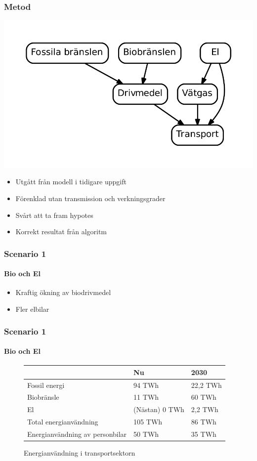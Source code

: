 \documentclass{beamer}
\begin{document}
\begin{frame}
	\frametitle{Metod}
	\includegraphics[scale=0.5]{../report2/diagram.pdf}
	\begin{itemize}
		\item Utgått från modell i tidigare uppgift
		\item Förenklad utan transmission och verkningsgrader
		\item Svårt att ta fram hypotes
		\item Korrekt resultat från algoritm
	\end{itemize}
\end{frame}

\begin{frame}
	\frametitle{Scenario 1}
	\framesubtitle{Bio och El}
	\begin{itemize}
		\item Kraftig ökning av biodrivmedel
		\item Fler elbilar
	\end{itemize}
\end{frame}

\begin{frame}
	\frametitle{Scenario 1}
	\framesubtitle{Bio och El}
	\begin{figure}[h!]
	\begin{center}
	\begin{tabular}{ | l | l | l | }
	\hline
						& Nu		& 2030 \\ \hline
	Fossil energi				& 94 TWh	& 22,2 TWh \\ \hline
	Biobränsle				& 11 TWh	& 60 TWh \\ \hline %
	El					& (Nästan) 0 TWh &  2,2 TWh \\ \hline %
	Total energianvändning		& 105 TWh	& 86 TWh \\ \hline
	Energianvändning av personbilar	& 50 TWh	& 35 TWh \\ \hline
	\end{tabular}
	\caption{Energianvändning i transportsektorn}
	\label{tab:scen1energi}
	\end{center}
	\end{figure}
\end{frame}
\end{document}
